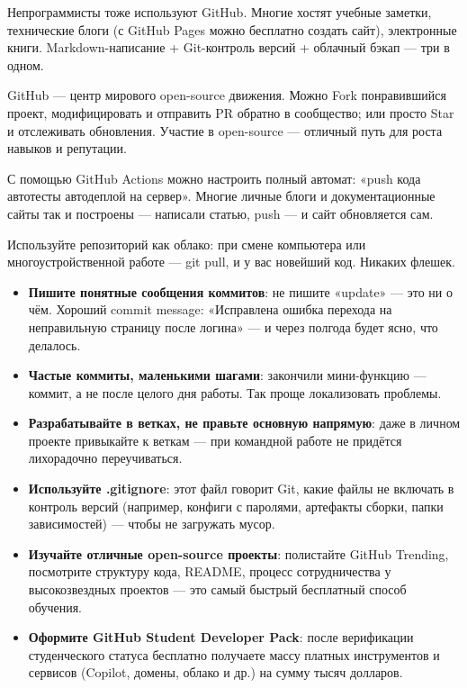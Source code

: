 Непрограммисты тоже используют GitHub. Многие хостят учебные заметки, технические блоги (с GitHub Pages можно бесплатно создать сайт), электронные книги. Markdown-написание + Git-контроль версий + облачный бэкап — три в одном.


GitHub — центр мирового open-source движения. Можно Fork понравившийся проект, модифицировать и отправить PR обратно в сообщество; или просто Star и отслеживать обновления. Участие в open-source — отличный путь для роста навыков и репутации.


С помощью GitHub Actions можно настроить полный автомат: «push кода автотесты автодеплой на сервер». Многие личные блоги и документационные сайты так и построены — написали статью, push — и сайт обновляется сам.


Используйте репозиторий как облако: при смене компьютера или многоустройственной работе — git pull, и у вас новейший код. Никаких флешек.


\begin{itemize}
  \item \textbf{Пишите понятные сообщения коммитов}: не пишите «update» — это ни о чём. Хороший commit message: «Исправлена ошибка перехода на неправильную страницу после логина» — и через полгода будет ясно, что делалось.
  \item \textbf{Частые коммиты, маленькими шагами}: закончили мини-функцию — коммит, а не после целого дня работы. Так проще локализовать проблемы.
  \item \textbf{Разрабатывайте в ветках, не правьте основную напрямую}: даже в личном проекте привыкайте к веткам — при командной работе не придётся лихорадочно переучиваться.
  \item \textbf{Используйте .gitignore}: этот файл говорит Git, какие файлы не включать в контроль версий (например, конфиги с паролями, артефакты сборки, папки зависимостей) — чтобы не загружать мусор.
  \item \textbf{Изучайте отличные open-source проекты}: полистайте GitHub Trending, посмотрите структуру кода, README, процесс сотрудничества у высокозвездных проектов — это самый быстрый бесплатный способ обучения.
  \item \textbf{Оформите GitHub Student Developer Pack}: после верификации студенческого статуса бесплатно получаете массу платных инструментов и сервисов (Copilot, домены, облако и др.) на сумму тысяч долларов.
\end{itemize}

